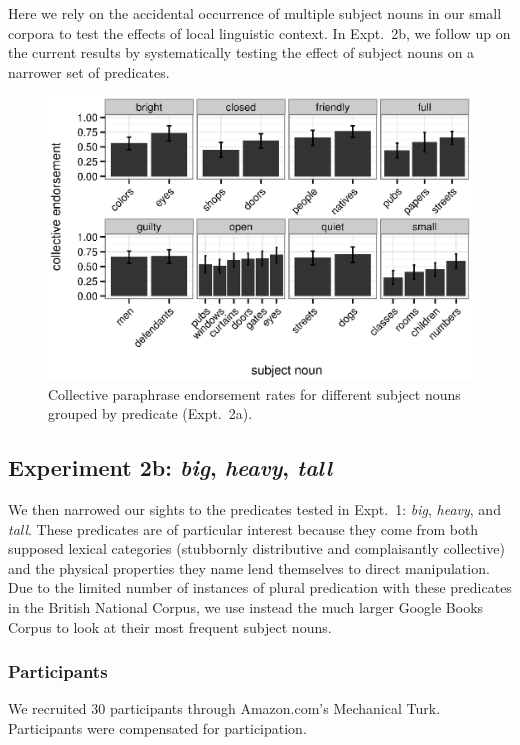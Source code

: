 \documentclass[linguex]{sp}
\begin{document}
Here we rely on the accidental occurrence of multiple subject nouns in our small corpora to test the effects of local linguistic context. In Expt.~2b, we follow up on the current results by systematically testing the effect of subject nouns on a narrower set of predicates.

\begin{figure}[h!]
	\centering
	\includegraphics[width=.85\linewidth]{plots/noun_pred_plot2.eps}
	\caption{Collective paraphrase endorsement rates for different subject nouns grouped by predicate (Expt.~2a).} \label{noun-pred-coll}
\end{figure}


\subsection{Experiment 2b: \emph{big}, \emph{heavy}, \emph{tall}}

We then narrowed our sights to the predicates tested in Expt.~1: \emph{big}, \emph{heavy}, and \emph{tall}. These predicates are of particular interest because they come from both supposed lexical categories (stubbornly distributive and complaisantly collective) and the physical properties they name lend themselves to direct manipulation.
Due to the limited number of instances of plural predication with these predicates in the British National Corpus, we use instead the much larger Google Books Corpus \citep{davies2011} to look at their most frequent subject nouns.

\subsubsection{Participants}

We recruited 30 participants through Amazon.com's Mechanical Turk. Participants were compensated for participation.
\end{document}
